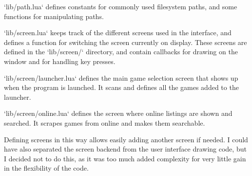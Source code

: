 \documentclass[10pt,twocolumn]{article}
\begin{document}
`lib/path.lua` defines constants for commonly used filesystem paths, and
some functions for manipulating paths.

`lib/screen.lua` keeps track of the different screens used in the interface,
and defines a function for switching the screen currently on display.
These screens are defined in the `lib/screen/` directory, and contain
callbacks for drawing on the window and for handling key presses.

`lib/screen/launcher.lua` defines the main game selection screen that
shows up when the program is launched. It scans and defines all the
games added to the launcher.

`lib/screen/online.lua` defines the screen where online listings are shown
and searched. It scrapes games from online and makes them searchable.

Defining screens in this way allows easily adding another screen if needed.
I could have also separated the screen backend from the user interface
drawing code, but I decided not to do this, as it was too much added
complexity for very little gain in the flexibility of the code.

\printbibliography

\appendix

\clearpage

\onecolumn
\end{document}
